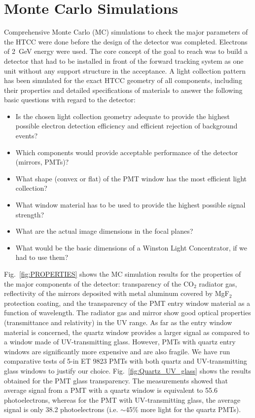 \section{Monte Carlo Simulations}
\label{htcc-sim-sec}

Comprehensive Monte Carlo (MC) simulations to check the major parameters of the HTCC were done before the
design of the detector was completed. Electrons of 2~GeV energy were used. The core concept of the goal to
reach was to build a detector that had to be installed in front of the forward tracking system as one unit without
any support structure in the acceptance. A light collection pattern has been simulated for the exact HTCC
geometry of all components, including their properties and detailed  specifications of materials to answer the
following basic questions with regard to the detector:

\begin{itemize}
\item Is the chosen light collection geometry adequate to provide the highest possible electron detection efficiency
  and efficient rejection of background events?
\item Which components would provide acceptable performance of the detector (mirrors, PMTs)?
\item What shape (convex or flat) of the PMT window has the most efficient light collection?
\item What window material has to be used to provide the highest possible signal strength?
\item What are the actual image dimensions in the focal planes?
\item What would be the basic dimensions of a Winston Light Concentrator, if we had to use them?
\end{itemize}

Fig.~\ref{fig:PROPERTIES} shows the MC simulation results for the properties of the major components of the
detector: transparency of the CO$_2$ radiator gas, reflectivity of the mirrors deposited with metal aluminum
covered by MgF$_2$ protection coating, and the transparency of the PMT entry window material as a function of
wavelength. The radiator gas and mirror show good optical properties (transmittance and relativity) in the UV
range. As far as the entry window material is concerned, the quartz window provides a larger signal as compared
to a window made of UV-transmitting glass. However, PMTs with quartz entry windows are significantly more
expensive and are also fragile. We have run comparative tests of 5-in ET 9823 PMTs with both quartz and
UV-transmitting glass windows to justify our choice. Fig.~\ref{fig:Quartz_UV_glass} shows the results obtained
for the PMT glass transparency. The measurements showed that average signal from a PMT with a quartz window
is equivalent to 55.6 photoelectrons, whereas for the PMT with UV-transmitting glass, the average signal is only
38.2 photoelectrons (i.e. $\sim$45\% more light for the quartz PMTs).

